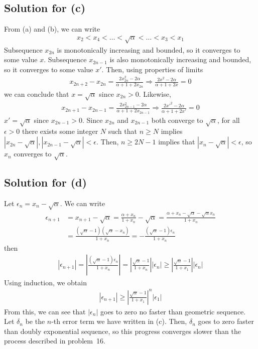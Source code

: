 \documentclass{scrartcl}
\begin{document}
\subsection{Solution for (c)}
From (a) and (b), we can write
\begin{align*}
  x_2 < x_4 < \dots < \sqrt\alpha < \dots < x_3 < x_1
\end{align*}
Subsequence \(x_{2n}\) is monotonically increasing and bounded, so it converges to some value \(x\).
Subsequence \(x_{2n - 1}\) is also monotonically increasing and bounded, so it converges to some value \(x'\).
Then, using properties of limits
\begin{align*}
  x_{2n + 2} - x_{2n} = \frac{2x_{2n}^2 - 2\alpha}{\alpha + 1 + 2x_{2n}} \Longrightarrow \frac{2x^2 - 2\alpha}{\alpha + 1 + 2x} = 0
\end{align*}
we can conclude that \(x = \sqrt\alpha\) since \(x_{2n} > 0\).
Likewise,
\begin{align*}
  x_{2n + 1} - x_{2n - 1} = \frac{2x_{2n - 1}^2 - 2\alpha}{\alpha + 1 + 2x_{2n - 1}} \Longrightarrow \frac{2{x'}^2 - 2\alpha}{\alpha + 1 + 2x'} = 0
\end{align*}
\(x' = \sqrt\alpha\) since \(x_{2n - 1} > 0\).
Since \(x_{2n}\) and \(x_{2n - 1}\) both converge to \(\sqrt\alpha\), for all \(\epsilon > 0\) there exists some integer \(N\) such that \(n \geq N\) implies \(|x_{2n} - \sqrt\alpha|, |x_{2n - 1} - \sqrt\alpha| < \epsilon\).
Then, \(n \geq 2N - 1\) implies that \(|x_n - \sqrt\alpha| < \epsilon\), so \(x_n\) converges to \(\sqrt\alpha\).

\subsection{Solution for (d)}
Let \(\epsilon_n = x_n - \sqrt\alpha\).
We can write
\begin{align*}
  \epsilon_{n + 1} &= x_{n + 1} - \sqrt\alpha = \frac{\alpha + x_n}{1 + x_n} - \sqrt\alpha = \frac{\alpha + x_n - \sqrt\alpha - \sqrt\alpha x_n}{1 + x_n} \\
                   &= \frac{(\sqrt\alpha - 1)(\sqrt\alpha - x_n)}{1 + x_n} = -\frac{(\sqrt\alpha - 1)\epsilon_n}{1 + x_n}
\end{align*}
then
\begin{align*}
  |\epsilon_{n + 1}| = \left| \frac{(\sqrt\alpha - 1)\epsilon_n}{1 + x_n} \right| = \left| \frac{\sqrt\alpha - 1}{1 + x_n} \right| |\epsilon_n| \geq \left| \frac{\sqrt\alpha - 1}{1 + x_1} \right| |\epsilon_n|
\end{align*}
Using induction, we obtain
\begin{align*}
  |\epsilon_{n + 1}| \geq \left| \frac{\sqrt\alpha - 1}{1 + x_1} \right|^n |\epsilon_1|
\end{align*}
From this, we can see that \(|\epsilon_n|\) goes to zero no faster than geometric sequence.
Let \(\delta_n\) be the \(n\)-th error term we have written in (c).
Then, \(\delta_n\) goes to zero faster than doubly exponential sequence, so this progress converges slower than the process described in problem~16.
\end{document}
